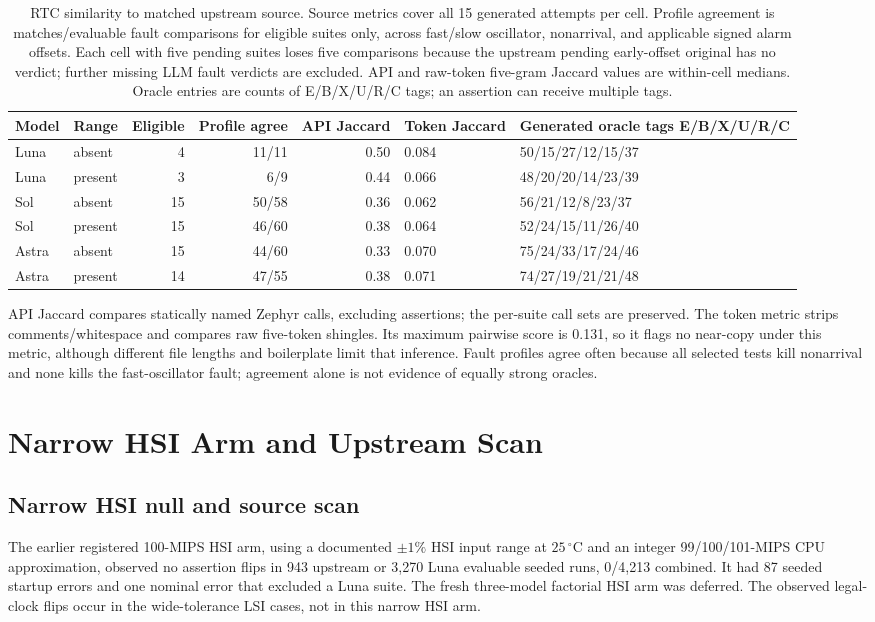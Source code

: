 \begin{table}[t]
\caption{RTC similarity to matched upstream source. Source metrics cover all 15 generated attempts per cell. Profile agreement is matches/evaluable fault comparisons for eligible suites only, across fast/slow oscillator, nonarrival, and applicable signed alarm offsets. Each cell with five pending suites loses five comparisons because the upstream pending early-offset original has no verdict; further missing LLM fault verdicts are excluded. API and raw-token five-gram Jaccard values are within-cell medians. Oracle entries are counts of E/B/X/U/R/C tags; an assertion can receive multiple tags.}
\label{tab:similarity}
\scriptsize
\begin{tabular}{@{}llrrrll@{}}
\toprule
Model & Range & Eligible & Profile agree & API Jaccard & Token Jaccard & Generated oracle tags E/B/X/U/R/C \\
\midrule
Luna & absent & 4 & 11/11 & 0.50 & 0.084 & 50/15/27/12/15/37 \\
Luna & present & 3 & 6/9 & 0.44 & 0.066 & 48/20/20/14/23/39 \\
Sol & absent & 15 & 50/58 & 0.36 & 0.062 & 56/21/12/8/23/37 \\
Sol & present & 15 & 46/60 & 0.38 & 0.064 & 52/24/15/11/26/40 \\
Astra & absent & 15 & 44/60 & 0.33 & 0.070 & 75/24/33/17/24/46 \\
Astra & present & 14 & 47/55 & 0.38 & 0.071 & 74/27/19/21/21/48 \\
\bottomrule
\end{tabular}
\end{table}

API Jaccard compares statically named Zephyr calls, excluding assertions; the per-suite call sets are preserved. The token metric strips comments/whitespace and compares raw five-token shingles. Its maximum pairwise score is 0.131, so it flags no near-copy under this metric, although different file lengths and boilerplate limit that inference. Fault profiles agree often because all selected tests kill nonarrival and none kills the fast-oscillator fault; agreement alone is not evidence of equally strong oracles.


\section{Narrow HSI Arm and Upstream Scan}\label{app:hsi}
\subsection{Narrow HSI null and source scan}
The earlier registered 100-MIPS HSI arm, using a documented $\pm1\%$ HSI input range at $25\,^{\circ}$C and an integer 99/100/101-MIPS CPU approximation, observed no assertion flips in 943 upstream or 3,270 Luna evaluable seeded runs, 0/4,213 combined. It had 87 seeded startup errors and one nominal error that excluded a Luna suite. The fresh three-model factorial HSI arm was deferred. The observed legal-clock flips occur in the wide-tolerance LSI cases, not in this narrow HSI arm.

